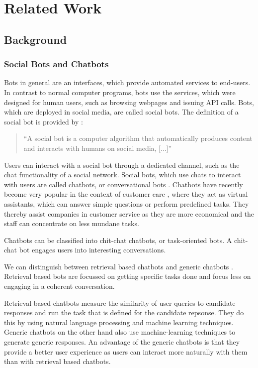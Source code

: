 \chapter{Related Work}

\section{Background}

\subsection{Social Bots and Chatbots}
Bots in general are an interfaces, which provide automated services to end-users. In contrast to normal computer programs, bots use the services, which were designed for human users, such as browsing webpages and issuing API calls. Bots, which are deployed in social media, are called social bots. The definition of a social bot is provided by \cite{FVD*16b}:
\begin{quote}
    ``A social bot is a computer algorithm that automatically produces content and interacts with humans on social media, [...]''
\end{quote}

Users can interact with a social bot through a dedicated channel, such as the chat functionality of a social network. Social bots, which use chats to interact with users are called chatbots, or conversational bots \cite{WWX*16}. Chatbots have recently become very popular in the context of customer care \cite{CHW*17,FVD*16b}, where they act as virtual assistants, which can answer simple questions or perform predefined tasks. They thereby assist companies in customer service as they are more economical and the staff can concentrate on less mundane tasks.

Chatbots can be classified into chit-chat chatbots, or task-oriented bots. A chit-chat bot engages users into interesting conversations.

We can distinguish between retrieval based chatbots and generic chatbots \cite{NLKl19,WWX*16}. Retrieval based bots are focussed on getting specific tasks done and focus less on engaging in a coherent conversation.

Retrieval based chatbots measure the similarity of user queries to candidate responses and run the task that is defined for the candidate repsonse. They do this by using natural language processing and machine learning techniques. Generic chatbots on the other hand also use machine-learning techniques to generate generic responses. An advantage of the generic chatbots is that they provide a better user experience as users can interact more naturally with them than with retrieval based chatbots.

